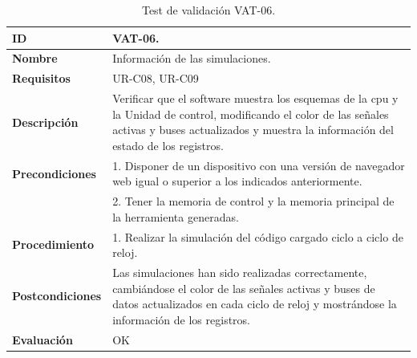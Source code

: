 \begin{center}
\begin{table}[htbp]
\centering
{}
\caption{Test de validación VAT-06.}
\label{tab:vat-06}
\begin{tabular}{@{}p{2.5cm} p{13cm}@{}} 
\toprule
\textbf{ID} 					& VAT-06. \\
\midrule
\textbf{Nombre} 				& Información de las simulaciones. \\
\midrule
\textbf{Requisitos} 		& UR-C08, UR-C09\\
\midrule
\textbf{Descripción} 		& Verificar que el \gls{software} muestra los esquemas de la \acrshort{cpu} y la Unidad de control, modificando el color de las señales activas y buses actualizados y muestra la información del estado de los registros. \\
\midrule
\textbf{Precondiciones}		& 1. Disponer de un dispositivo con una versión de navegador web igual o superior a los indicados anteriormente. \\
											& 2. Tener la memoria de control y la memoria principal de la herramienta generadas. \\
\midrule
\textbf{Procedimiento}		& 1. Realizar la simulación del código cargado ciclo a ciclo de reloj.\\
\midrule
\textbf{Postcondiciones} 		&  Las simulaciones han sido realizadas correctamente, cambiándose el color de las señales activas y buses de datos actualizados en cada ciclo de reloj y mostrándose la información de los registros.\\
\midrule
\textbf{Evaluación} 			& OK \\
\bottomrule
\end{tabular}
\end{table}
\end{center}

\vspace{-1.5cm}


